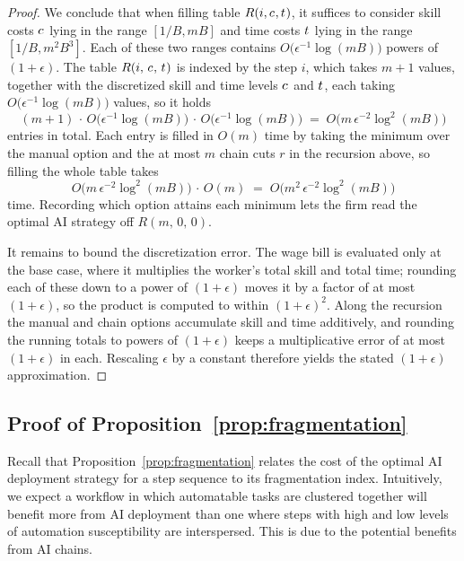 \begin{proof}
We conclude that when filling table $R(i, c_{}, t_{})$, it suffices to consider skill costs $c_{}$ lying in the range $[1/B, mB]$ and time costs $t_{}$ lying in the range $[1/B, m^2 B^3]$.
Each of these two ranges contains $O\bigl(\epsilon^{-1}\log(mB)\bigr)$ powers of $(1+\epsilon)$.
The table $R(i,\, c_{},\, t_{})$ is indexed by the step $i$, which takes $m+1$ values, together with the discretized skill and time levels $c_{}$ and $t_{}$, each taking $O\bigl(\epsilon^{-1}\log(mB)\bigr)$ values, so it holds
\[
(m+1)\,\cdot\,O\bigl(\epsilon^{-1}\log(mB)\bigr)\,\cdot\,O\bigl(\epsilon^{-1}\log(mB)\bigr) \;=\; O\bigl(m\,\epsilon^{-2}\log^2(mB)\bigr)
\]
entries in total.
Each entry is filled in $O(m)$ time by taking the minimum over the manual option and the at most $m$ chain cuts $r$ in the recursion above, so filling the whole table takes
\[
O\bigl(m\,\epsilon^{-2}\log^2(mB)\bigr)\,\cdot\,O(m) \;=\; O\bigl(m^2\,\epsilon^{-2}\log^2(mB)\bigr)
\]
time.
Recording which option attains each minimum lets the firm read the optimal AI strategy off $R(m,\, 0,\, 0)$.

It remains to bound the discretization error.
The wage bill is evaluated only at the base case, where it multiplies the worker's total skill and total time; rounding each of these down to a power of $(1+\epsilon)$ moves it by a factor of at most $(1+\epsilon)$, so the product is computed to within $(1+\epsilon)^2$.
Along the recursion the manual and chain options accumulate skill and time additively, and rounding the running totals to powers of $(1+\epsilon)$ keeps a multiplicative error of at most $(1+\epsilon)$ in each.
Rescaling $\epsilon$ by a constant therefore yields the stated $(1+\epsilon)$ approximation.
\end{proof}

\subsection{Proof of Proposition~\ref{prop:fragmentation}}

Recall that Proposition~\ref{prop:fragmentation} relates the cost of the optimal AI deployment strategy for a step sequence to its fragmentation index.
Intuitively, we expect a workflow in which automatable tasks are clustered together will benefit more from AI deployment than one where steps with high and low levels of automation susceptibility are interspersed.
This is due to the potential benefits from AI chains.

